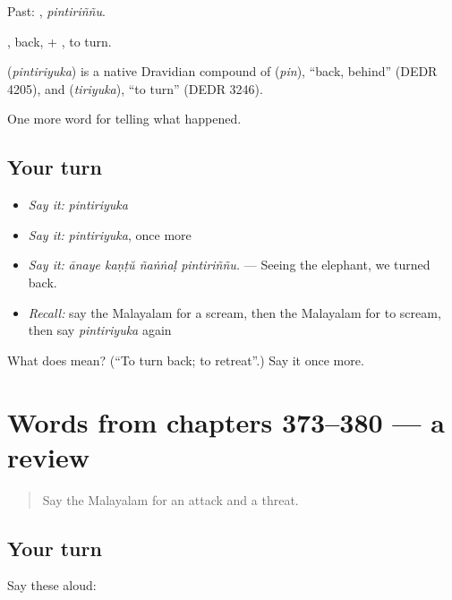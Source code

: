 Past: , \emph{pintiriññu}.

, back, + , to turn.

\begin{cousinweb}
\textbf{} (\emph{pintiriyuka}) is a native Dravidian compound of  (\emph{pin}), \textquotedblleft{}back, behind\textquotedblright{} (DEDR 4205), and  (\emph{tiriyuka}), \textquotedblleft{}to turn\textquotedblright{} (DEDR 3246).
\end{cousinweb}

\begin{grammarlens}[title={What you've built}]
One more word for telling what happened.
\end{grammarlens}

\subsection*{Your turn}
\begin{itemize}
\raggedright
  \item \emph{Say it:} \emph{pintiriyuka}
  \item \emph{Say it:} \emph{pintiriyuka}, once more
  \item \emph{Say it:} \emph{ānaye kaṇṭŭ ñaṅṅaḷ pintiriññu.} — Seeing the elephant, we turned back.
  \item \emph{Recall:} say the Malayalam for a scream, then the Malayalam for to scream, then say \emph{pintiriyuka} again
\end{itemize}

\begin{tcolorbox}[breakable,colback=teal!4,colframe=teal!35!black,title={Before you move on}]
What does  mean? (\textquotedblleft{}To turn back; to retreat\textquotedblright{}.) Say it once more.
\end{tcolorbox}
\section[(dialogue)]{Words from chapters 373–380 — a review}

\label{lesson:ML-R380-review-373-380}



\begin{quote}
Say the Malayalam for an attack and a threat.
\end{quote}

\subsection*{Your turn}
Say these aloud:

